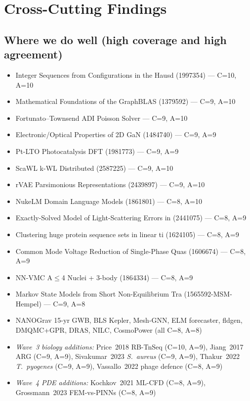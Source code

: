 \section{Cross-Cutting Findings}\label{sec:crosscutting}

\subsection{Where we do well (high coverage and high agreement)}
\begin{itemize}[leftmargin=1.4em,itemsep=0.2em,topsep=0.2em]
\item Integer Sequences from Configurations in the Hausd (1997354) --- C=10, A=10
\item Mathematical Foundations of the GraphBLAS (1379592) --- C=9, A=10
\item Fortunato--Townsend ADI Poisson Solver --- C=9, A=10
\item Electronic/Optical Properties of 2D GaN (1484740) --- C=9, A=9
\item Pt-LTO Photocatalysis DFT (1981773) --- C=9, A=9
\item ScaWL k-WL Distributed (2587225) --- C=9, A=10
\item rVAE Parsimonious Representations (2439897) --- C=9, A=10
\item NukeLM Domain Language Models (1861801) --- C=8, A=10
\item Exactly-Solved Model of Light-Scattering Errors in (2441075) --- C=8, A=9
\item Clustering huge protein sequence sets in linear ti (1624105) --- C=8, A=9
\item Common Mode Voltage Reduction of Single-Phase Quas (1606674) --- C=8, A=9
\item NN-VMC A$\leq$4 Nuclei + 3-body (1864334) --- C=8, A=9
\item Markov State Models from Short Non-Equilibrium Tra (1565592-MSM-Hempel) --- C=9, A=8
\item NANOGrav 15-yr GWB, BLS Kepler, Mesh-GNN, ELM forecaster, fldgen, DMQMC+GPR, DRAS, NILC, CosmoPower (all C=8, A=8)
\item \textit{Wave~3 biology additions:} Price~2018 RB-TnSeq (C=10, A=9), Jiang~2017 ARG (C=9, A=9), Sivakumar~2023 \textit{S.\ aureus} (C=9, A=9), Thakur~2022 \textit{T.\ pyogenes} (C=9, A=9), Vassallo~2022 phage defence (C=8, A=9)
\item \textit{Wave~4 PDE additions:} Kochkov~2021 ML-CFD (C=8, A=9), Grossmann~2023 FEM-vs-PINNs (C=8, A=9)
\end{itemize}

